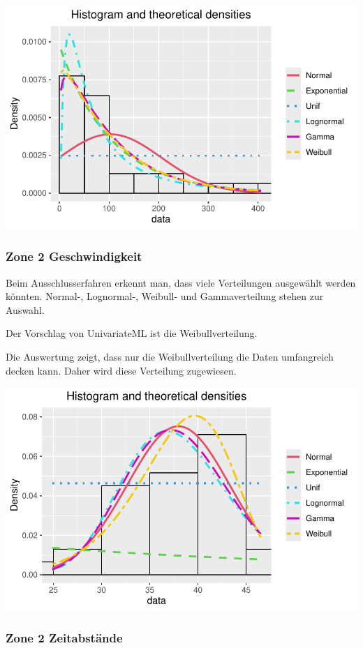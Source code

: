 \documentclass[
  letterpaper,
  DIV=11,
  numbers=noendperiod]{scrartcl}
\begin{document}
\includegraphics{steinschlag_bericht_files/figure-pdf/unnamed-chunk-11-1.pdf}

\subsubsection{Zone 2 Geschwindigkeit}\label{zone-2-geschwindigkeit}

Beim Ausschlusserfahren erkennt man, dass viele Verteilungen ausgewählt
werden könnten. Normal-, Lognormal-, Weibull- und Gammaverteilung stehen
zur Auswahl.

Der Vorschlag von UnivariateML ist die Weibullverteilung.

Die Auswertung zeigt, dass nur die Weibullverteilung die Daten
umfangreich decken kann. Daher wird diese Verteilung zugewiesen.

\includegraphics{steinschlag_bericht_files/figure-pdf/unnamed-chunk-13-1.pdf}

\subsubsection{Zone 2 Zeitabstände}\label{zone-2-zeitabstuxe4nde}
\end{document}
